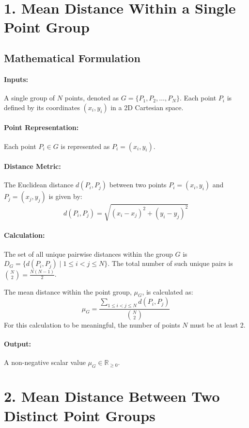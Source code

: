 \documentclass{article}
\begin{document}
\section*{1. Mean Distance Within a Single Point Group}

\subsection*{Mathematical Formulation}

\paragraph{Inputs:}
A single group of $N$ points, denoted as $G = \{P_1, P_2, \dots, P_N\}$. Each point $P_i$ is defined by its coordinates $(x_i, y_i)$ in a 2D Cartesian space.

\paragraph{Point Representation:}
Each point $P_i \in G$ is represented as $P_i = (x_i, y_i)$.

\paragraph{Distance Metric:}
The Euclidean distance $d(P_i, P_j)$ between two points $P_i = (x_i, y_i)$ and $P_j = (x_j, y_j)$ is given by:
$$ d(P_i, P_j) = \sqrt{(x_i - x_j)^2 + (y_i - y_j)^2} $$

\paragraph{Calculation:}
The set of all unique pairwise distances within the group $G$ is $D_G = \{d(P_i, P_j) \mid 1 \le i < j \le N\}$.
The total number of such unique pairs is $\binom{N}{2} = \frac{N(N-1)}{2}$.

The mean distance within the point group, $\mu_G$, is calculated as:
$$ \mu_G = \frac{\sum_{1 \le i < j \le N} d(P_i, P_j)}{\binom{N}{2}} $$
For this calculation to be meaningful, the number of points $N$ must be at least 2.

\paragraph{Output:}
A non-negative scalar value $\mu_G \in \mathbb{R}_{\ge 0}$.

\section*{2. Mean Distance Between Two Distinct Point Groups}
\end{document}
